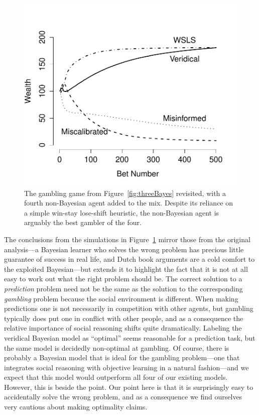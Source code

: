 \documentclass[doc,floatsintext]{apa6}
\begin{document}
\begin{figure}[t]
	\centering
	\includegraphics[width=.6\textwidth]{other_figs/threeBayesPlusWSLS.pdf}
	\caption{The gambling game from Figure~\protect\ref{fig:threeBayes} revisited, with a fourth non-Bayesian agent added to the mix. Despite its reliance on a simple win-stay lose-shift heuristic, the non-Bayesian agent is arguably the best gambler of the four. }
	\label{fig:gamblingRevisited}
\end{figure}

The conclusions from the simulations in Figure~\ref{fig:gamblingRevisited} mirror those from the original analysis---a Bayesian learner who solves the wrong problem has precious little guarantee of success in real life, and Dutch book arguments are a cold comfort to the exploited Bayesian---but extends it to highlight the fact that it is not at all easy to work out what the right problem should be. The correct solution to a {\it prediction} problem need not be the same as the solution to the corresponding {\it gambling} problem because the social environment is different. When making predictions one is not necessarily in competition with other agents, but gambling typically does put one in conflict with other people, and as a consequence the relative importance of social reasoning shifts quite dramatically. Labeling the veridical Bayesian model as ``optimal'' seems reasonable for a prediction task, but the same model is decidedly non-optimal at gambling. Of course, there is probably a Bayesian model that is ideal for the gambling problem---one that integrates social reasoning with objective learning in  a natural fashion---and we expect that this model would outperform all four of our existing models. However, this is beside the point. Our point here is that it is surprisingly easy to accidentally solve the wrong problem, and as a consequence we find ourselves very cautious about making optimality claims.
\end{document}
